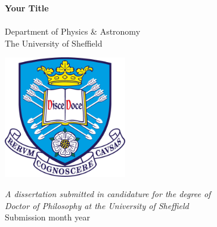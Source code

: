 \documentclass[a4paper,12pt,oneside,openright]{report}
\newcommand\blankpage{%
    \null
    \thispagestyle{empty}%
    \addtocounter{page}{-1}%
    \newpage}
\begin{document}
\begin{center}
\fontsize{24.88}{57.6}
\vspace*{-1cm}

\textbf{Your Title}\\
\vspace*{2.5cm}
\LARGE
{}\\
\vspace{2cm}
\Large{Department of Physics \& Astronomy}\\
\Large{The University of Sheffield}\\
\vspace*{1cm}

\includegraphics[width=0.4\textwidth]{./figures/logo/tuoslogo2.jpg}\\

\vspace*{1cm}

\large
{\it A dissertation submitted in candidature for the degree of}\\
{\it Doctor of Philosophy at the University of Sheffield}\\
\vspace*{1.5cm}
{Submission month year}
\vfill
\end{center}
\afterpage{\blankpage}


\normalsize 




\end{document}
